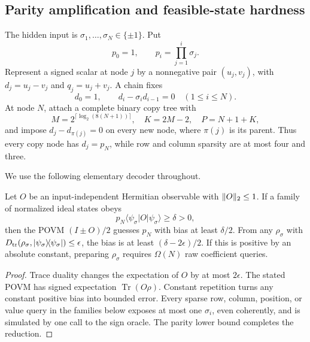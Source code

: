 \subsection{Parity amplification and feasible-state hardness}
\label{sec:lp-foundation}

The hidden input is \(\sigma_1,\ldots,\sigma_N\in\{\pm1\}\).  Put
\[
 p_0=1,\qquad p_i=\prod_{j=1}^i\sigma_j.
\]
Represent a signed scalar at node \(j\) by a nonnegative pair
\((u_j,v_j)\), with \(d_j=u_j-v_j\) and \(q_j=u_j+v_j\).  A chain fixes
\begin{equation}
 d_0=1,\qquad d_i-\sigma_i d_{i-1}=0\quad(1\leq i\leq N).
\end{equation}
At node \(N\), attach a complete binary copy tree with
\begin{equation}
 M=2^{\lceil\log_2(8(N+1))\rceil},\quad K=2M-2,
 \quad P=N+1+K,
\end{equation}
and impose \(d_j-d_{\pi(j)}=0\) on every new node, where \(\pi(j)\) is
its parent.  Thus every copy node has \(d_j=p_N\), while row and column sparsity
are at most four and three.

We use the following elementary decoder throughout.

\begin{lemma}
\label{lem:lp-decoder}
Let \(O\) be an input-independent Hermitian observable with \(\lVert O\rVert_2\leq1\).
If a family of normalized ideal states obeys
\[
 p_N\langle\psi_\sigma|O|\psi_\sigma\rangle\geq\delta>0,
\]
then the POVM \((I\pm O)/2\) guesses \(p_N\) with bias at least
\(\delta/2\).  From any \(\rho_\sigma\) with
\(D_{\mathrm{tr}}(\rho_\sigma,\lvert \psi_\sigma\rangle\!\langle \psi_\sigma\rvert)\leq\epsilon\),
the bias is at least \((\delta-2\epsilon)/2\).  If this is positive by an
absolute constant, preparing \(\rho_\sigma\) requires \(\Omega(N)\) raw
coefficient queries.
\end{lemma}

\begin{proof}
Trace duality changes the expectation of \(O\) by at most \(2\epsilon\).
The stated POVM has signed expectation \(\operatorname{Tr}(O\rho)\).  Constant
repetition turns any constant positive bias into bounded error.  Every sparse
row, column, position, or value query in the families below exposes at most one
\(\sigma_i\), even coherently, and is simulated by one call to the sign oracle.
The parity lower bound completes the reduction.
\end{proof}

